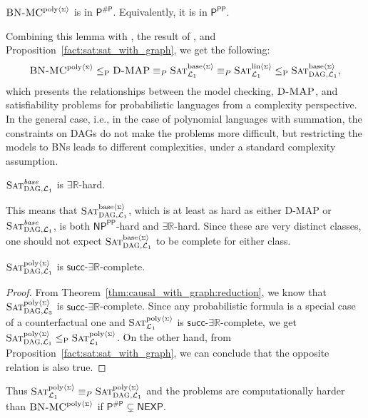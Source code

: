 \documentclass[a4paper,UKenglish,cleveref, autoref, thm-restate]{lipics-v2021}
\newcommand{\IR}{\mathbb{R}}
\newcommand{\existsR}{\ensuremath{\mathsf{\exists\IR}}}
\newcommand{\succR}{\ensuremath{\mathsf{succ\text{-}\exists\IR}}}
\newcommand{\NP}{\ensuremath{\mathsf{NP}}}
\newcommand{\cP}{\ensuremath{\mathsf{P}}}
\newcommand{\NEXP}{\ensuremath{\mathsf{NEXP}}}
\newcommand{\ccPP}{\ensuremath{\mathsf{PP}}}
\newcommand{\sharpP}{\#\mathsf{P}}
\newcommand{\leqp}{\leq_{\text{P}}}
\newcommand{\cL}{{\mathcal L}}
\def\probsumname#1#2{^{\text{#1}{\langle{\scriptscriptstyle\Sigma}\rangle}}_{\text{#2}}}
\def\probsumgraphname#1#2{^{\text{#1}{\langle{\scriptscriptstyle\Sigma}\rangle}}_{\mbox{\scriptsize\sc DAG}, \text{#2}}}
\newcommand{\SATprobcompgraph}{\mbox{\sc Sat}^{\textit{base}}_{\mbox{\scriptsize\sc DAG}, {\cL_1}}}
\newcommand{\SATprobcompsumgraph}{\mbox{\sc Sat}\probsumgraphname{base}{${\cal L}_1$}}
\newcommand{\SATprobpolysumgraph}{\mbox{\sc Sat}\probsumgraphname{poly}{${\cal L}_1$}}
\newcommand{\SATcausalpolysumgraph}{\mbox{\sc Sat}\probsumgraphname{poly}{${\cal L}_3$}}
\def\probsumBN#1{^{\text{#1}{\langle{\scriptscriptstyle\Sigma}\rangle}}}
\newcommand{\SATprobpolysumBN}{\mbox{\sc BN-MC}\probsumBN{poly}}
\newcommand{\SATprobcompsum}{\mbox{\sc Sat}\probsumname{base}{${\cal L}_1$}}
\newcommand{\SATproblinsum}{\mbox{\sc Sat}\probsumname{lin}{${\cal L}_1$}}
\newcommand{\SATprobpolysum}{\mbox{\sc Sat}\probsumname{poly}{${\cal L}_1$}}
\begin{document}
\begin{theorem}\label{thm:SATproblinbBN:DAG}
	$\SATprobpolysumBN$ is in $\cP^{\sharpP}$.
	Equivalently, it is in $\cP^{\ccPP}$.
\end{theorem}


Combining this lemma with \cite[Thm. 4]{doerflerICLR2025}, the result 
of \cite{park2004complexity}, and Proposition~\ref{fact:sat:sat_with_graph}, we get the following:
$$
 \SATprobpolysumBN \leqp \mbox{\sc D-MAP} \equiv_ P \SATprobcompsum \equiv_ P  \SATproblinsum  \leqp \SATprobcompsumgraph, 
 $$
which presents the relationships between the model checking,  $\mbox{\sc D-MAP}$, and satisfiability problems
for probabilistic languages  from a complexity perspective.
In the general case, i.e., in the case of polynomial languages with summation, the constraints on DAGs do not make the problems more difficult, but restricting the models to BNs leads to different complexities,  under a standard complexity assumption.

\begin{lemma}\label{prop:prob:comp:sum:graph:er:hard}
$\SATprobcompgraph$ is $ \existsR$-hard.     
\end{lemma}


This means that $\SATprobcompsumgraph$, which is at least as hard as either {\sc D-MAP} or $\SATprobcompgraph$, is both $\NP^{\ccPP}$-hard and $\existsR$-hard. Since these are very distinct classes, one should not expect $\SATprobcompsumgraph$ to be complete for either class. 

\begin{proposition}\label{prop:SATprobstargraph:1:new1}
	$\SATprobpolysumgraph$ is $ \succR$-complete. 
\end{proposition}
\begin{proof}From  Theorem~\ref{thm:causal_with_graph:reduction}, we know that 
$\SATcausalpolysumgraph$ is $ \succR$-complete.
Since any probabilistic formula is a special case of a counterfactual one and 
$\SATprobpolysum$ is $ \succR$-complete, we get 
$ \SATprobpolysumgraph \leqp \SATprobpolysum$.
On the other hand, from Proposition~\ref{fact:sat:sat_with_graph}, we can conclude that 
the opposite  relation  is also true.
\end{proof}

Thus
 $\SATprobpolysum \equiv_P \SATprobpolysumgraph$
 and the problems are computationally harder than $\SATprobpolysumBN$ if $\cP^{\sharpP} \subsetneq \NEXP .$ 
\end{document}
